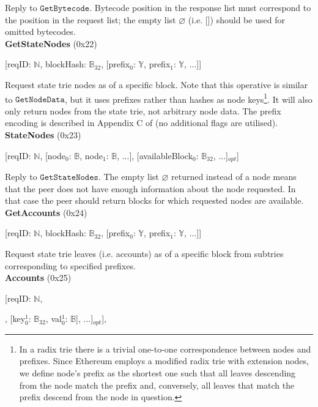 \documentclass{amsart}
\begin{document}
Reply to $\texttt{GetBytecode}$.
Bytecode position in the response list must correspond to the position in the request list;
the empty list $\varnothing$ (i.e. []) should be used for omitted bytecodes.\\

\textbf{GetStateNodes} (0x22)

[reqID: $\mathbb{N}$, blockHash: $\mathbb{B}_{32}$,
[prefix$_0$: $\mathbb{Y}$, prefix$_1$: $\mathbb{Y}$, ...]]
\medskip

Request state trie nodes as of a specific block.
Note that this operative is similar to $\texttt{GetNodeData}$,
but it uses prefixes rather than hashes as node keys\footnote{In
a radix trie there is a trivial one-to-one correspondence between nodes and prefixes.
Since Ethereum employs a modified radix trie with extension nodes,
we define node's prefix as the shortest one such that
all leaves descending from the node match the prefix
and, conversely, all leaves that match the prefix descend from the node in question.}.
It will also only return nodes from the state trie,
not arbitrary node data.
The prefix encoding is described in Appendix C of \cite{yellow_paper}
(no additional flags are utilised).\\

\textbf{StateNodes} (0x23)

[reqID: $\mathbb{N}$,
[node$_0$: $\mathbb{B}$, node$_1$: $\mathbb{B}$, ...],
[availableBlock$_0$: $\mathbb{B}_{32}$, ...]$_{opt}$]
\medskip

Reply to $\texttt{GetStateNodes}$.
The empty list $\varnothing$ returned instead of a node means that the peer does not have enough information about the node requested.
In that case the peer should return blocks for which requested nodes are available.\\

\textbf{GetAccounts} (0x24)

[reqID: $\mathbb{N}$, blockHash: $\mathbb{B}_{32}$, [prefix$_0$: $\mathbb{Y}$, prefix$_1$: $\mathbb{Y}$, ...]]
\medskip

Request state trie leaves (i.e. accounts) as of a specific block
from subtries corresponding to specified prefixes.\\

\textbf{Accounts} (0x25)

[reqID: $\mathbb{N}$,

\quad [

\qquad [status$_0$: $\mathbb{N}$, [[key$^0_{0}$: $\mathbb{B}_{32}$, val$^0_{0}$: $\mathbb{B}$], [key$^1_{0}$: $\mathbb{B}_{32}$, val$^1_{0}$: $\mathbb{B}$], ...]$_{opt}$],
\end{document}
